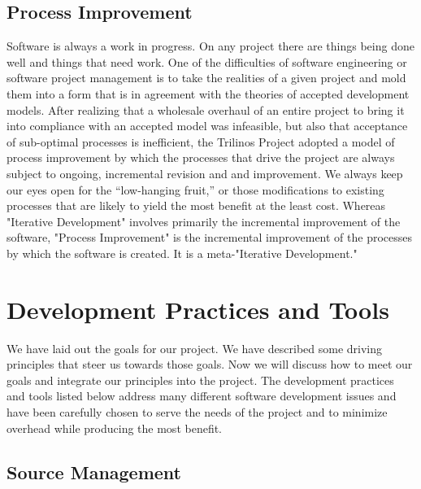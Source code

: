 \documentclass[12pt,relax]{article}
\begin{document}
\subsection{Process Improvement}

Software is always a work in progress.  On any project there are things
being done well and things that need work.  One of the difficulties of 
software engineering or software project management is to take the realities
of a given project and mold them into a form that is in agreement with the
theories of accepted development models.  After realizing that a wholesale 
overhaul of an entire project to bring it into compliance with an accepted
model was infeasible, but also that acceptance of sub-optimal processes is
inefficient, the Trilinos Project adopted a model of process improvement by
which the processes that drive the project are always subject to ongoing,
incremental revision and and improvement.  We always keep our eyes open for the 
``low-hanging fruit,'' or those modifications to existing processes that are
likely to yield the most benefit at the least cost.  Whereas "Iterative
Development" involves primarily the incremental improvement of the software,
"Process Improvement" is the incremental improvement of the processes by which
the software is created.  It is a meta-"Iterative Development."

\clearpage


\section{Development Practices and Tools}
\label{Section:Tools}

We have laid out the goals for our project.  We have described some driving
principles that steer us towards those goals.  Now we will discuss how to meet 
our goals and integrate our principles into the project.  The development
practices and tools listed below address many different software development
issues and have been carefully chosen to serve the needs of the project and to
minimize overhead while producing the most benefit.


\subsection{Source Management}
\end{document}
